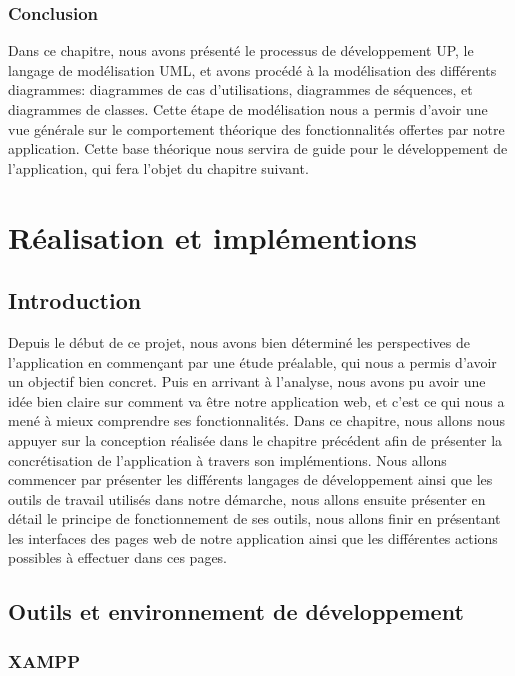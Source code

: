 \documentclass[french]{report}
\begin{document}
\subsection{Conclusion}
Dans ce chapitre, nous avons présenté le processus de développement UP, le
langage de modélisation UML, et avons procédé à la modélisation des différents
diagrammes: diagrammes de cas d'utilisations, diagrammes de séquences, et
diagrammes de classes. Cette étape de modélisation nous a permis d'avoir une vue
générale sur le comportement théorique des fonctionnalités offertes par notre
application.  Cette base théorique nous servira de guide pour le développement
de l'application, qui fera l'objet du chapitre suivant.



\chapter{Réalisation et implémentions}

\section{Introduction}

Depuis le début de ce projet, nous avons bien déterminé les perspectives de
l'application en commençant par une étude préalable, qui nous a permis d'avoir
un objectif bien concret. Puis en arrivant à l'analyse, nous avons pu avoir une
idée bien claire sur comment va être notre application web, et c'est ce qui nous
a mené à mieux comprendre ses fonctionnalités. Dans ce chapitre, nous allons
nous appuyer sur la conception réalisée dans le chapitre précédent afin de
présenter la concrétisation de l'application à travers son implémentions. Nous
allons commencer par présenter les différents langages de développement ainsi
que les outils de travail utilisés dans notre démarche, nous allons ensuite
présenter en détail le principe de fonctionnement de ses outils, nous allons
finir en présentant les interfaces des pages web de notre application ainsi que
les différentes actions possibles à effectuer dans ces pages.
    
\section{Outils et environnement de développement}

\subsection{XAMPP}
\end{document}
